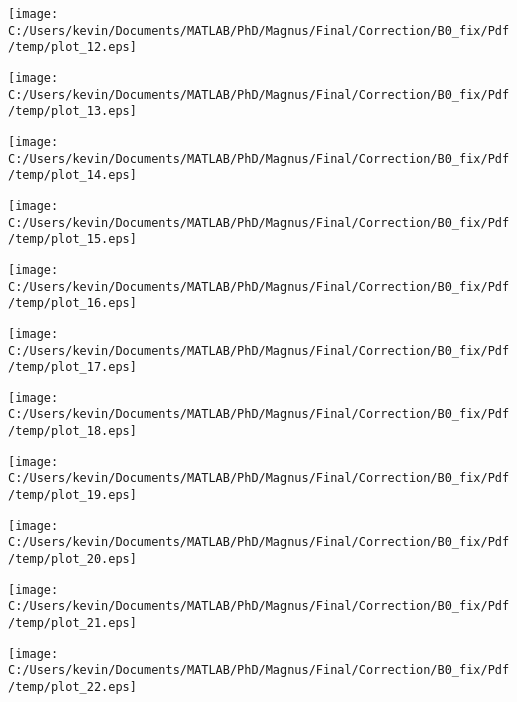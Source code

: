 \begin{landscape}
\texttt{[image: C:/Users/kevin/Documents/MATLAB/PhD/Magnus/Final/Correction/B0\_fix/Pdf/temp/plot\_12.eps]}
\end{landscape}
\begin{landscape}
\texttt{[image: C:/Users/kevin/Documents/MATLAB/PhD/Magnus/Final/Correction/B0\_fix/Pdf/temp/plot\_13.eps]}
\end{landscape}
\begin{landscape}
\texttt{[image: C:/Users/kevin/Documents/MATLAB/PhD/Magnus/Final/Correction/B0\_fix/Pdf/temp/plot\_14.eps]}
\end{landscape}
\begin{landscape}
\texttt{[image: C:/Users/kevin/Documents/MATLAB/PhD/Magnus/Final/Correction/B0\_fix/Pdf/temp/plot\_15.eps]}
\end{landscape}
\begin{landscape}
\texttt{[image: C:/Users/kevin/Documents/MATLAB/PhD/Magnus/Final/Correction/B0\_fix/Pdf/temp/plot\_16.eps]}
\end{landscape}
\begin{landscape}
\texttt{[image: C:/Users/kevin/Documents/MATLAB/PhD/Magnus/Final/Correction/B0\_fix/Pdf/temp/plot\_17.eps]}
\end{landscape}
\begin{landscape}
\texttt{[image: C:/Users/kevin/Documents/MATLAB/PhD/Magnus/Final/Correction/B0\_fix/Pdf/temp/plot\_18.eps]}
\end{landscape}
\begin{landscape}
\texttt{[image: C:/Users/kevin/Documents/MATLAB/PhD/Magnus/Final/Correction/B0\_fix/Pdf/temp/plot\_19.eps]}
\end{landscape}
\begin{landscape}
\texttt{[image: C:/Users/kevin/Documents/MATLAB/PhD/Magnus/Final/Correction/B0\_fix/Pdf/temp/plot\_20.eps]}
\end{landscape}
\begin{landscape}
\texttt{[image: C:/Users/kevin/Documents/MATLAB/PhD/Magnus/Final/Correction/B0\_fix/Pdf/temp/plot\_21.eps]}
\end{landscape}
\begin{landscape}
\texttt{[image: C:/Users/kevin/Documents/MATLAB/PhD/Magnus/Final/Correction/B0\_fix/Pdf/temp/plot\_22.eps]}
\end{landscape}
